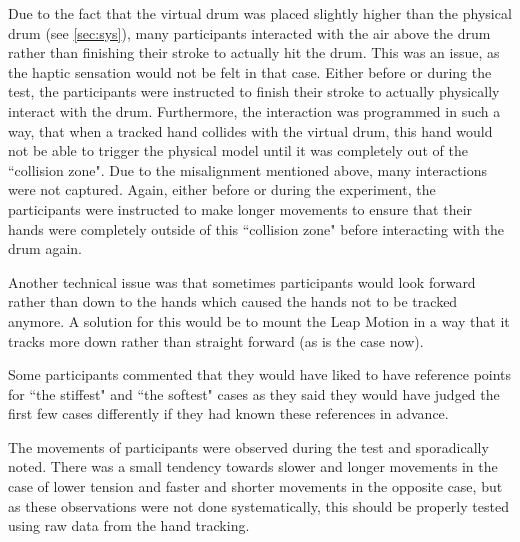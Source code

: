 \documentclass{vgtc}
\begin{document}
Due to the fact that the virtual drum was placed slightly higher than the physical drum (see \autoref{sec:sys}), many participants interacted with the air above the drum rather than finishing their stroke to actually hit the drum. This was an issue, as the haptic sensation would not be felt in that case. Either before or during the test, the participants were instructed to finish their stroke to actually physically interact with the drum. 
Furthermore, the interaction was programmed in such a way, that when a tracked hand collides with the virtual drum, this hand would not be able to trigger the physical model until it was completely out of the ``collision zone". Due to the misalignment mentioned above, many interactions were not captured. Again, either before or during the experiment, the participants were instructed to make longer movements to ensure that their hands were completely outside of this ``collision zone" before interacting with the drum again.

Another technical issue was that sometimes participants would look forward rather than down to the hands which caused the hands not to be tracked anymore. A solution for this would be to mount the Leap Motion in a way that it tracks more down rather than straight forward (as is the case now).

Some participants commented that they would have liked to have reference points for ``the stiffest" and ``the softest" cases as they said they would have judged the first few cases differently if they had known these references in advance.

The movements of participants were observed during the test and sporadically noted. There was a small tendency towards slower and longer movements in the case of lower tension and faster and shorter movements in the opposite case, but as these observations were not done systematically, this should be properly tested using raw data from the hand tracking.

\end{document}
